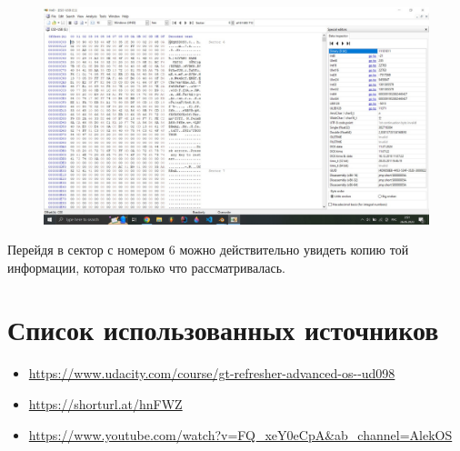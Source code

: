 \documentclass[a4paper,12pt]{article}
\begin{document}
    \begin{figure}[H]
        \centering
        \includegraphics[width=\linewidth]{img0}
    \end{figure}
    
    Перейдя в сектор с номером $6$ можно действительно увидеть копию той информации, которая только что рассматривалась.
    
    \section{Список использованных источников}

    \begin{itemize}
        \item \url{https://www.udacity.com/course/gt-refresher-advanced-os--ud098}
        \item \url{https://shorturl.at/hnFWZ}
        \item \url{https://www.youtube.com/watch?v=FQ_xeY0eCpA&ab_channel=AlekOS}
    \end{itemize}
\end{document}
